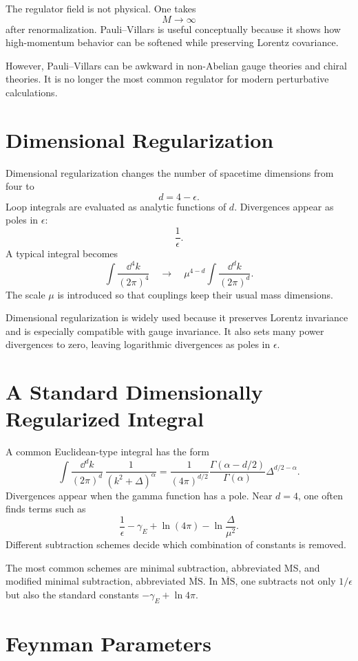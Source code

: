 The regulator field is not physical. One takes
\[
    M\to\infty
\]
after renormalization. Pauli--Villars is useful conceptually because it shows
how high-momentum behavior can be softened while preserving Lorentz covariance.

However, Pauli--Villars can be awkward in non-Abelian gauge theories and chiral
theories. It is no longer the most common regulator for modern perturbative
calculations.

\section{Dimensional Regularization}

Dimensional regularization changes the number of spacetime dimensions from four
to
\[
    d=4-\epsilon.
\]
Loop integrals are evaluated as analytic functions of \(d\). Divergences appear
as poles in \(\epsilon\):
\[
    \frac{1}{\epsilon}.
\]
A typical integral becomes
\[
    \int\frac{\dd^4k}{(2\pi)^4}
    \quad\longrightarrow\quad
    \mu^{4-d}\int\frac{\dd^dk}{(2\pi)^d}.
\]
The scale \(\mu\) is introduced so that couplings keep their usual mass
dimensions.

Dimensional regularization is widely used because it preserves Lorentz
invariance and is especially compatible with gauge invariance. It also sets many
power divergences to zero, leaving logarithmic divergences as poles in
\(\epsilon\).

\section{A Standard Dimensionally Regularized Integral}

A common Euclidean-type integral has the form
\[
    \int\frac{\dd^dk}{(2\pi)^d}\,
    \frac{1}{(k^2+\Delta)^\alpha}
    = \frac{1}{(4\pi)^{d/2}}\frac{\Gamma(\alpha-d/2)}{\Gamma(\alpha)}
      \Delta^{d/2-\alpha}.
\]
Divergences appear when the gamma function has a pole. Near \(d=4\), one often
finds terms such as
\[
    \frac{1}{\epsilon}-\gamma_E+\ln(4\pi)-\ln\frac{\Delta}{\mu^2}.
\]
Different subtraction schemes decide which combination of constants is removed.

The most common schemes are minimal subtraction, abbreviated MS, and modified
minimal subtraction, abbreviated \(\overline{\mathrm{MS}}\). In
\(\overline{\mathrm{MS}}\), one subtracts not only \(1/\epsilon\) but also the
standard constants \(-\gamma_E+\ln4\pi\).

\section{Feynman Parameters}

